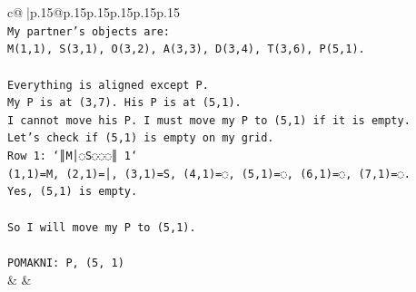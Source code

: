 \documentclass{article}
\begin{document}
{\begin{supertabular}{c@{$\;$}|p{.15\linewidth}@{}p{.15\linewidth}p{.15\linewidth}p{.15\linewidth}p{.15\linewidth}p{.15\linewidth}}
{{{\\ 
\texttt{My partner's objects are:} \\
\texttt{M(1,1), S(3,1), O(3,2), A(3,3), D(3,4), T(3,6), P(5,1).} \\
\\ 
\texttt{Everything is aligned except P.} \\
\texttt{My P is at (3,7). His P is at (5,1).} \\
\texttt{I cannot move his P. I must move my P to (5,1) if it is empty.} \\
\texttt{Let's check if (5,1) is empty on my grid.} \\
\texttt{Row 1: `║M│◌S◌◌◌║ 1`} \\
\texttt{(1,1)=M, (2,1)=│, (3,1)=S, (4,1)=◌, (5,1)=◌, (6,1)=◌, (7,1)=◌.} \\
\texttt{Yes, (5,1) is empty.} \\
\\ 
\texttt{So I will move my P to (5,1).} \\
\\ 
\texttt{POMAKNI: P, (5, 1)} \\
            }
        }
    }
    & & \\ \\


\end{supertabular}}
\end{document}
